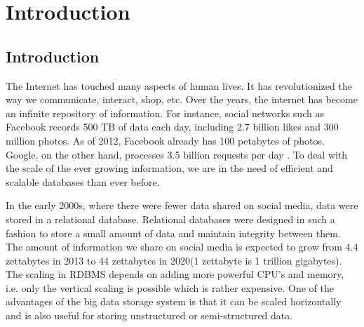 \documentclass[11pt,a4paper,bibtotoc,idxtotoc,headsepline,footsepline,footexclude,BCOR12mm,DIV13]{scrbook}
\begin{document}
	\frontmatter
	
	
	
	
	
	
%	
	\clearemptydoublepage
	
	
	
	
	
	
	
	
	
	
	

	\tableofcontents
  

	\mainmatter
	
	



\chapter{Introduction}
\label{chap:introduction}

\section{Introduction}
\label{Introduction}
The Internet has touched many aspects of human lives. It has revolutionized the way we communicate, interact, shop, etc. Over the years, the internet has become an infinite repository of information. For instance, social networks such as Facebook records  500 TB of data each day\cite{daniel:datastats}, including 2.7 billion likes and 300 million photos. As of 2012, Facebook already has 100 petabytes of photos\cite{daniel:datastats}. Google, on the other hand, processes 3.5 billion requests per day \cite{daniel:datastats}. To deal with the scale of the ever growing information, we are in the need of efficient and scalable databases than ever before. 

In the early 2000s, where there were fewer data shared on social media, data were stored in a relational database. Relational databases were designed in such a fashion to store a small amount of data and maintain integrity between them\cite{matt:rdb}. The amount of information we share on social media is expected to grow from 4.4 zettabytes in 2013 to 44 zettabytes in 2020(1 zettabyte is 1 trillion gigabytes)\cite{matt:rdb}. The scaling in RDBMS depends on adding more powerful CPU's and memory, i.e. only the vertical scaling is possible which is rather expensive.  One of the advantages of the big data storage system is that it can be scaled horizontally and is also useful for storing unstructured or semi-structured data. 
\end{document}
